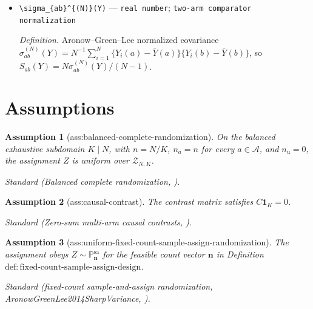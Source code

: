 \documentclass{article}
\newtheorem{assumption}{Assumption}
\begin{document}
\begin{itemize}
  \par\smallskip\noindent\emph{Definition.} \texttt{Treated count,\allowbreak{} denoted m in Aronow,\allowbreak{} Green,\allowbreak{} and Lee's binary design.}
  \item \texttt{\textbackslash{}\allowbreak{}sigma\_\allowbreak{}\{ab\}\allowbreak{}\textasciicircum{}\{(N)\}\allowbreak{}(Y)} --- \texttt{real number}; \texttt{two-\allowbreak{}arm comparator normalization}
  \par\smallskip\noindent\emph{Definition.} Aronow--Green--Lee normalized covariance \(\sigma_{ab}^{(N)}(Y)=N^{-1}\sum_{i=1}^N\{Y_i(a)-\bar Y(a)\}\{Y_i(b)-\bar Y(b)\}\), so \(S_{ab}(Y)=N\sigma_{ab}^{(N)}(Y)/(N-1)\).
\end{itemize}

\section{Assumptions}

\begin{assumption}[ass:balanced-complete-randomization]\label{ass:balanced-complete-randomization}
On the balanced exhaustive subdomain \(K\mid N\), with \(n=N/K\), \(n_a=n\) for every \(a\in\mathcal A\), and \(n_{\mathrm u}=0\), the assignment \(Z\) is uniform over \(\mathcal Z_{N,K}\).
\par\smallskip\noindent\emph{Standard} (Balanced complete randomization, \cite{ZhaoDing2023MultiarmedAdjustment}).
\end{assumption}

\begin{assumption}[ass:causal-contrast]\label{ass:causal-contrast}
The contrast matrix satisfies \(C\mathbf 1_K=0\).
\par\smallskip\noindent\emph{Standard} (Zero-sum multi-arm causal contrasts, \cite{ZhaoDing2023MultiarmedAdjustment}).
\end{assumption}

\begin{assumption}[ass:uniform-fixed-count-sample-assign-randomization]\label{ass:uniform-fixed-count-sample-assign-randomization}
The assignment obeys \(Z\sim\mathbb P_{\mathbf n}^{\mathrm{sa}}\) for the feasible count vector \(\mathbf n\) in Definition \(\mathrm{def{:}fixed\text{-}count\text{-}sample\text{-}assign\text{-}design}\).
\par\smallskip\noindent\emph{Standard} (fixed-count sample-and-assign randomization, AronowGreenLee2014SharpVariance, \cite{AronowGreenLee2014SharpVariance}).
\end{assumption}
\end{document}
